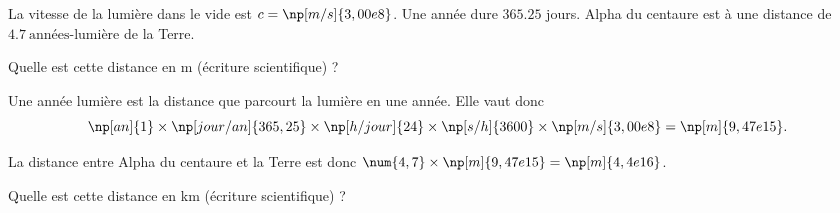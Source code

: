 La vitesse de la lumière dans le vide est $c=\np[m/s]{3,00e8}$. Une année dure $\num{365,25}$ jours. Alpha du centaure est à une distance de $\SI{4,7}{\text{années-lumière}}$ de la Terre. 

\debutEntrainement





\begin{enonce}
Quelle est cette distance en \si{m} (écriture scientifique) ? 
\end{enonce}


\begin{corrige}
Une année lumière est la distance que parcourt la lumière en une année. Elle vaut donc 
\[
\np[an]{1} \times \np[jour/an]{365,25} \times \np[h/jour]{24} \times \np[s/h]{3600} \times \np[m/s]{3,00e8} = \np[m]{9,47e15}.
\]

La distance entre Alpha du centaure et la Terre est donc $\num{4,7}\times \np[m]{9,47e15} = \np[m]{4,4e16}$.
\end{corrige}





\begin{enonce}
Quelle est cette distance en \si{km} (écriture scientifique) ? 
\end{enonce}




\finEntrainement





